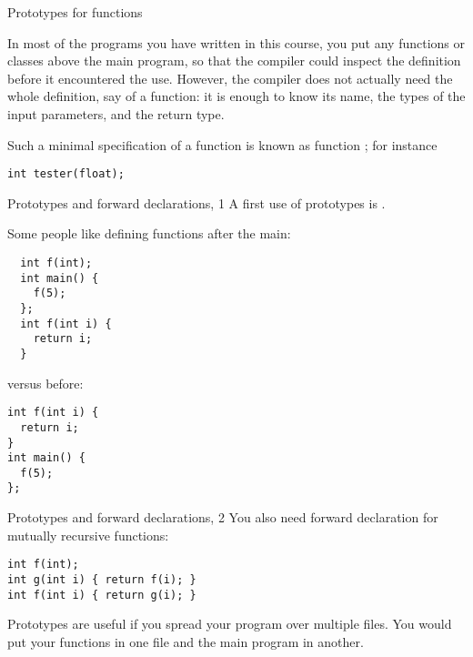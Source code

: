 
 {Prototypes for functions}
\label{sec:proto}

In most of the programs you have written in this course, you put any
functions or classes above the main program, so that the compiler
could inspect the definition before it encountered the use. However,
the compiler does not actually need the whole definition, say of a
function: it is enough to know its name, the types of the input
parameters, and the return type.

Such a minimal specification of a function is known as function
; for instance
\begin{lstlisting}
int tester(float);
\end{lstlisting}

\begin{block}{Prototypes and forward declarations, 1}
  \label{sl:forward-proto1}
  A first use of prototypes is .

  Some people like defining functions after the main:
\begin{multicols}{2}
\begin{lstlisting}
  int f(int);
  int main() {
    f(5);
  };
  int f(int i) {
    return i;
  }
\end{lstlisting}
\columnbreak
versus before:
\begin{lstlisting}
int f(int i) {
  return i;
}
int main() {
  f(5);
};
\end{lstlisting}
\end{multicols}
\end{block}

\begin{block}{Prototypes and forward declarations, 2}
  \label{sl:forward-proto2}
  You also need forward declaration for mutually recursive functions:
\begin{lstlisting}
int f(int);
int g(int i) { return f(i); }
int f(int i) { return g(i); }
\end{lstlisting}
\end{block}

Prototypes are useful if you spread your program over multiple
files. You would put your functions in one file
and the main program in another.

